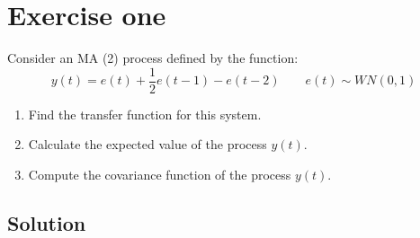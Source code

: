 \section{Exercise one}

Consider an MA (2) process defined by the function:
\[y(t)=e(t)+\dfrac{1}{2}e(t-1)-e(t-2) \qquad e(t)\sim WN(0,1)\]
\begin{enumerate}
    \item Find the transfer function for this system.
    \item Calculate the expected value of the process $y(t)$. 
    \item Compute the covariance function of the process $y(t)$. 
\end{enumerate}

\subsection*{Solution}

